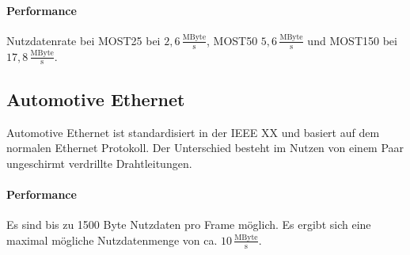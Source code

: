 \paragraph{Performance}
Nutzdatenrate bei MOST25 bei $ 2,6\,\frac{\mathrm{MByte}}{\mathrm{s}} $, MOST50 $ 5,6\,\frac{\mathrm{MByte}}{\mathrm{s}} $  und MOST150 bei $ 17,8\,\frac{\mathrm{MByte}}{\mathrm{s}} $.
\cite[Vgl. Seite 119 ff.]{Zimmermann.2014}
\subsection{Automotive Ethernet}
Automotive Ethernet ist standardisiert in der IEEE XX und basiert auf dem normalen Ethernet Protokoll. Der Unterschied besteht im Nutzen von einem Paar ungeschirmt verdrillte Drahtleitungen.
\paragraph{Performance}
Es sind bis zu 1500 Byte Nutzdaten pro Frame möglich. Es ergibt sich eine maximal mögliche Nutzdatenmenge von ca. $ 10\,\frac{\mathrm{MByte}}{\mathrm{s}} $. \cite[Vgl. Seite 138 ff.]{Zimmermann.2014}

